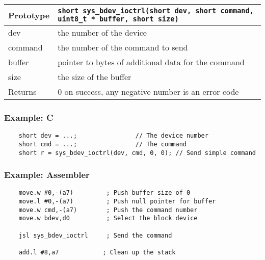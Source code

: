 \bigskip

\begin{tabular}{|l||l|} \hline
Prototype & \lstinline!short sys_bdev_ioctrl(short dev, short command, uint8_t * buffer, short size)! \\ \hline
dev & the number of the device \\ \hline
command & the number of the command to send \\ \hline
buffer & pointer to bytes of additional data for the command \\ \hline
size & the size of the buffer \\ \hline
Returns & 0 on success, any negative number is an error code \\ \hline
\end{tabular}

\subsubsection*{Example: C}
\begin{lstlisting}
    short dev = ...;                // The device number
    short cmd = ...;                // The command
    short r = sys_bdev_ioctrl(dev, cmd, 0, 0); // Send simple command
\end{lstlisting}

\subsubsection*{Example: Assembler}
\begin{verbatim}
    move.w #0,-(a7)         ; Push buffer size of 0
    move.l #0,-(a7)         ; Push null pointer for buffer
    move.w cmd,-(a7)        ; Push the command number
    move.w bdev,d0          ; Select the block device
    
    jsl sys_bdev_ioctrl     ; Send the command

    add.l #8,a7            ; Clean up the stack
\end{verbatim}